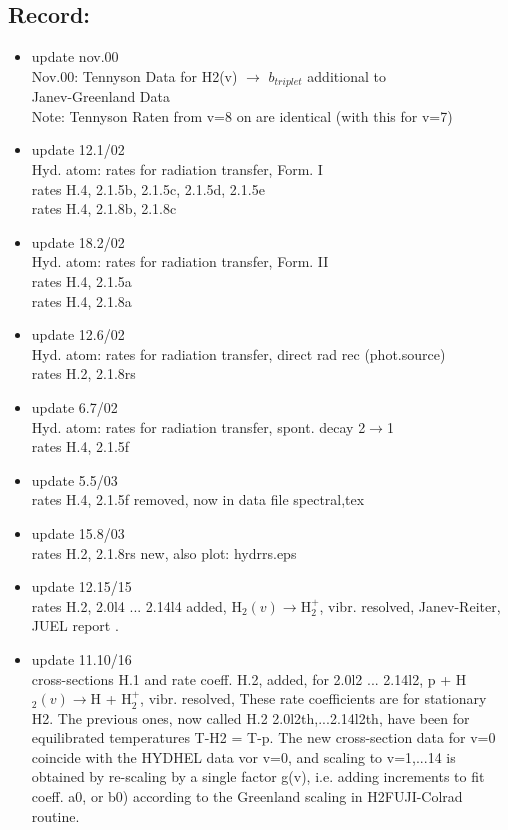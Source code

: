 \documentclass[12pt,dvipdfmx]{article}
\begin{document}
\subsection{Record:}\label{record}
\begin{itemize}
\item update  nov.00  \\
Nov.00: Tennyson Data for H2(v) $\rightarrow$ $b_{triplet}$ additional to\\
        Janev-Greenland Data       \\
        Note: Tennyson Raten from v=8 on are identical (with this for v=7)
\item update  12.1/02 \\
   Hyd. atom: rates for radiation transfer, Form. I\\
     rates H.4, 2.1.5b, 2.1.5c, 2.1.5d, 2.1.5e \\
     rates H.4, 2.1.8b, 2.1.8c \\
\item update  18.2/02 \\
   Hyd. atom: rates for radiation transfer, Form. II \\
     rates H.4, 2.1.5a \\
     rates H.4, 2.1.8a \\
\item update  12.6/02 \\
   Hyd. atom: rates for radiation transfer, direct rad rec (phot.source) \\
     rates H.2, 2.1.8rs\\
\item update   6.7/02 \\
   Hyd. atom: rates for radiation transfer, spont. decay 2$\rightarrow$1 \\
     rates H.4, 2.1.5f\\
\item update   5.5/03 \\
     rates H.4, 2.1.5f removed, now in data file spectral,tex\\
\item update  15.8/03 \\
     rates H.2, 2.1.8rs new, also plot: hydrrs.eps\\
\item update  12.15/15 \\
     rates H.2, 2.0l4 ... 2.14l4 added, H$_2(v) \rightarrow $H$_2^+$, vibr. resolved, Janev-Reiter, JUEL report \cite{kn:JRS}.
\item update  11.10/16 \\
cross-sections H.1 and
rate coeff. H.2, added, for 2.0l2 ... 2.14l2, p + H$_2(v) \rightarrow $H + H$_2^+$, vibr. resolved,
These rate coefficients are for stationary H2. The previous ones,
now called H.2 2.0l2th,...2.14l2th, have been
for equilibrated temperatures T-H2 = T-p.
The new cross-section data for v=0 coincide with the HYDHEL data vor v=0,
and scaling to v=1,...14 is obtained by re-scaling by a single factor g(v), i.e.
adding increments to fit coeff. a0, or b0)
according to the Greenland scaling in H2FUJI-Colrad routine.
\end{itemize}
\end{document}
